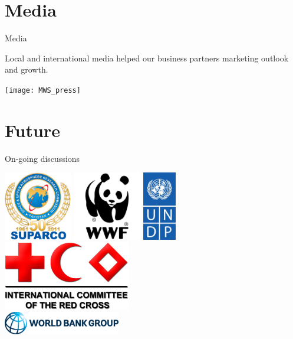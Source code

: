 \documentclass[xcolor=dvipsnames,beamer,unknownkeysallowed]{beamer} %
\begin{document}
\section{Media}
\begin{frame}[fragile]{Media}

 Local and international media helped our business partners marketing outlook and growth.

\begin{center}
  \texttt{[image: MWS\_press]}
\end{center}

\end{frame}

\section{Future}
\begin{frame}[fragile]{On-going discussions}

\begin{center}
  \includegraphics[height=3cm]{suparco_logo}
  \hspace{1mm}
  \includegraphics[height=3cm]{wwf_logo}
  \hspace{1mm}
  \includegraphics[height=3cm]{undp_logo}  \\
  \vspace{5mm}
  \includegraphics[height=3cm]{icrc_logo}  \\
  \vspace{3mm}
  \includegraphics[height=1cm]{wb_logo}
\end{center}

\end{frame}
\end{document}
